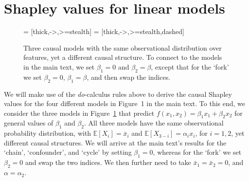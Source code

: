 \documentclass{article}
\newcommand{\expectation}{\mathbb{E}}
\newcommand{\bx}{\bar{x}}
\begin{document}
\section{Shapley values for linear models}

\begin{figure}
		\centering
		 = [thick,->,>=stealth]
		 = [thick,->,>=stealth,dashed]
	\caption{Three causal models with the same observational distribution over features, yet a different causal structure. To connect to the models in the main text, we set $\beta_1 = 0$ and $\beta_2 = \beta$, except that for the `fork' we set $\beta_2 = 0$, $\beta_1 = \beta$, and then swap the indices.}
	\label{fig:threemodels}
\end{figure}

We will make use of the {\em do}-calculus rules above to derive the causal Shapley values for the four different models in Figure~1 in the main text. To this end, we consider the three models in Figure~\ref{fig:threemodels} that predict $f(x_1,x_2) = \beta_1 x_1 + \beta_2 x_2$ for general values of $\beta_1$ and $\beta_2$. All three models have the same observational probability distribution, with $\expectation[X_i] = \bx_i$ and $\expectation[X_{3-i}] = \alpha_i x_i$, for $i = 1,2$, yet different causal structures. We will arrive at the main text's results for the `chain', `confounder', and `cycle' by setting $\beta_1 = 0$, whereas for the `fork' we set $\beta_2 = 0$ and swap the two indices. We then further need to take $\bx_1 = \bx_2 = 0$, and $\alpha = \alpha_2$.
\end{document}
